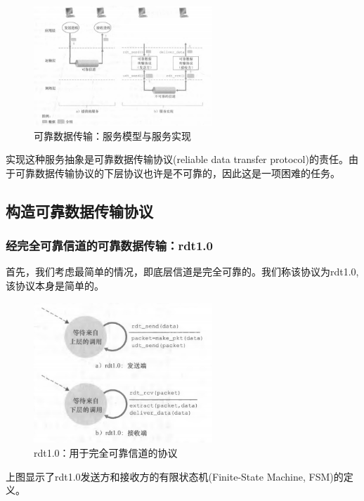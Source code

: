 \begin{figure}[!htbp]
    \centering
    \includegraphics[width=0.6\textwidth]{image/chapter03/可靠数据传输.png}
    \caption{可靠数据传输：服务模型与服务实现}
\end{figure}

    实现这种服务抽象是可靠数据传输协议(reliable data transfer protocol)的责任。由于可靠数据传输协议的下层协议也许是不可靠的，因此这是一项困难的任务。

\subsection{构造可靠数据传输协议}

\subsubsection{经完全可靠信道的可靠数据传输：rdt1.0}

    首先，我们考虑最简单的情况，即底层信道是完全可靠的。我们称该协议为rdt1.0,该协议本身是简单的。

\begin{figure}[!htbp]
    \centering
    \includegraphics[width=0.6\textwidth]{image/chapter03/rdt1.0-用于完全可信的数据传输.png}
    \caption{rdt1.0：用于完全可靠信道的协议}
\end{figure}

    上图显示了rdt1.0发送方和接收方的有限状态机(Finite-State Machine, FSM)的定义。

